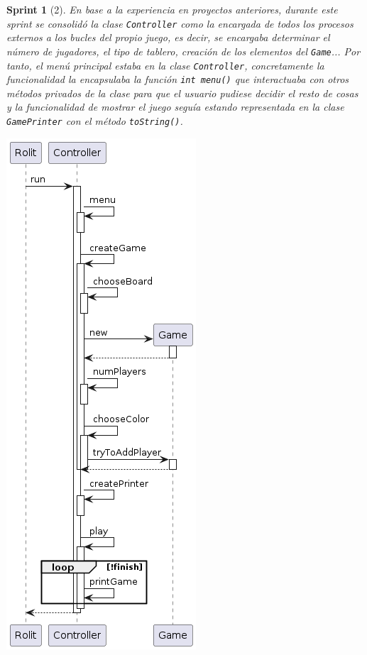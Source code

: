 \documentclass[12pt,a4paper,openright]{book}
\theoremstyle{break}
\newtheorem*{sprint}{Sprint}
\begin{document}
\begin{sprint}[2]
En base a la experiencia en proyectos anteriores, durante este sprint se consolidó la clase \texttt{Controller} como la encargada de todos los procesos externos a los bucles del propio juego, es decir, se encargaba determinar el número de jugadores, el tipo de tablero, creación de los elementos del \texttt{Game}... Por tanto, el menú principal estaba en la clase \texttt{Controller}, concretamente la funcionalidad la encapsulaba la función \texttt{int menu()} que interactuaba con otros métodos privados de la clase para que el usuario pudiese decidir el resto de cosas y la funcionalidad de mostrar el juego seguía estando representada en la clase \texttt{GamePrinter} con el método \texttt{toString()}.

\begin{center}
\includegraphics[scale=0.5]{MenuPpal_sprint2_seq}
\end{center}
\end{sprint}
\end{document}
